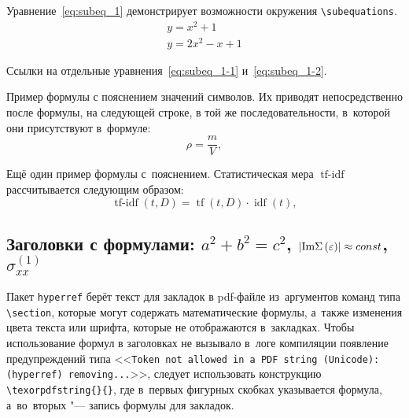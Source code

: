 Уравнение~\eqref{eq:subeq_1} демонстрирует возможности
окружения \verb|\subequations|.
\begin{subequations}
    \label{eq:subeq_1}
    \begin{gather}
        y = x^2 + 1 \label{eq:subeq_1-1} \\
        y = 2 x^2 - x + 1 \label{eq:subeq_1-2}
    \end{gather}
\end{subequations}

Ссылки на отдельные уравнения~\eqref{eq:subeq_1-1} и~\eqref{eq:subeq_1-2}.

Пример формулы с пояснением значений символов. Их приводят 
непосредственно после формулы, на следующей строке, в той же 
последовательности, в~которой они присутствуют в~формуле:
\[
\rho = \frac{m}{V},
\]

Ещё один пример формулы с~пояснением. 
Статистическая мера $\operatorname{tf-idf}$ рассчитывается 
следующим образом:
\begin{equation}\label{eq:tf-idf}
\operatorname{tf-idf}(t, D) = \operatorname{tf}(t, D) \cdot \operatorname{idf}(t),
\end{equation}





\subsection{Заголовки с формулами: \texorpdfstring{\(a^2 + b^2 = c^2\)}{%
        a\texttwosuperior\ + b\texttwosuperior\ = c\texttwosuperior},
    \texorpdfstring{\(\left\vert\textrm{{Im}}\Sigma\left(
            \protect\varepsilon\right)\right\vert\approx const\)}{|ImΣ (ε)| ≈ const},
    \texorpdfstring{\(\sigma_{xx}^{(1)}\)}{σ\_\{xx\}\textasciicircum\{(1)\}}
}\label{sub:with_math}

Пакет \texttt{hyperref} берёт текст для закладок в pdf-файле из~аргументов
команд типа \verb|\section|, которые могут содержать математические формулы,
а~также изменения цвета текста или шрифта, которые не отображаются в~закладках.
Чтобы использование формул в заголовках не вызывало в~логе компиляции появление
предупреждений типа <<\texttt{Token not allowed in~a~PDF string
    (Unicode):(hyperref) removing...}>>, следует использовать конструкцию
\verb|\texorpdfstring{}{}|, где в~первых фигурных скобках указывается
формула, а~во~вторых "--- запись формулы для закладок.




\FloatBarrier
